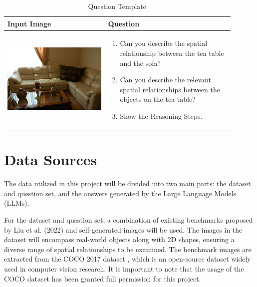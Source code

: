 \documentclass[journal,10pt]{IEEEtran}
\begin{document}
\begin{table}[ht]
    \centering
    \caption{Question Template}
    \label{tab:question_template}
    \begin{tabular}{|p{0.4\linewidth}|p{0.5\linewidth}|}
        \hline
        \textbf{Input Image} &\textbf{Question}\\
        \hline
        \begin{center} \includegraphics[width=\linewidth]{./pic/000000573553.jpg} \end{center}
        & \begin{enumerate}
            \item Can you describe the spatial relationship between the tea table and the sofa?
            \item Can you describe the relevant spatial relationships between the objects on the tea table?
            \item Show the Reasoning Steps.
        \end{enumerate}\\
        \hline
        \end{tabular}
\end{table}


\section{Data Sources}
The data utilized in this project will be divided into two main parts: the dataset and question set, and the answers generated by the Large Language Models (LLMs).

For the dataset and question set, a combination of existing benchmarks proposed by Liu et al. (2022) \cite{liu2022visual} and self-generated images will be used. The images in the dataset will encompass real-world objects along with 2D shapes, ensuring a diverse range of spatial relationships to be examined. The benchmark images are extracted from the COCO 2017 dataset \cite{lin2014microsoft}, which is an open-source dataset widely used in computer vision research. It is important to note that the usage of the COCO dataset has been granted full permission for this project.
\end{document}
